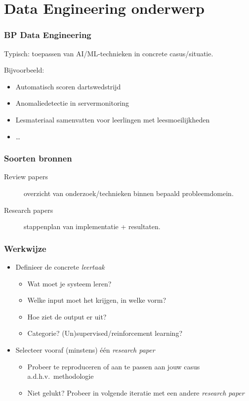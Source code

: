 \documentclass[aspectratio=169]{beamer}
\begin{document}
\section{Data Engineering onderwerp}

\begin{frame}
  \frametitle{BP Data Engineering}

  Typisch: toepassen van AI/ML-technieken in concrete casus/situatie.
  
  \bigskip

  Bijvoorbeeld:

  \begin{itemize}
    \item Automatisch scoren dartswedstrijd
    \item Anomaliedetectie in servermonitoring
    \item Lesmateriaal samenvatten voor leerlingen met leesmoeilijkheden
    \item \ldots
  \end{itemize}

\end{frame}

\begin{frame}
  \frametitle{Soorten bronnen}

  \begin{description}
    \item[Review papers] overzicht van onderzoek/technieken binnen bepaald probleemdomein.
    \item[Research papers] stappenplan van implementatie + resultaten.
  \end{description}

\end{frame}

\begin{frame}[plain]
  \frametitle{Werkwijze}

  \begin{itemize}
    \item Definieer de concrete \textit{leertaak}
    \begin{itemize}
      \item Wat moet je systeem leren?
      \item Welke input moet het krijgen, in welke vorm?
      \item Hoe ziet de output er uit?
      \item Categorie? (Un)supervised/reinforcement learning?
    \end{itemize}
    \item Selecteer vooraf (minstens) één \textit{research paper}
    \begin{itemize}
      \item Probeer te reproduceren of aan te passen aan jouw casus a.d.h.v.\ methodologie
      \item Niet gelukt? Probeer in volgende iteratie met een andere \textit{research paper}
    \end{itemize}
    
  \end{itemize}


\end{frame}
\end{document}
